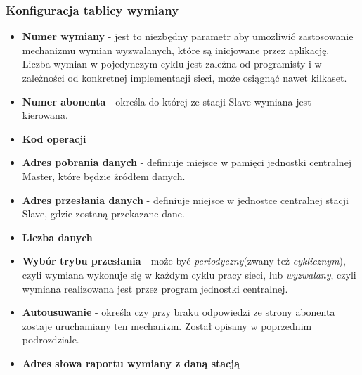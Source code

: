 \documentclass[a4paper,twoside]{article}
\begin{document}
	\subsubsection{Konfiguracja tablicy wymiany}
	\begin{itemize}
		\item \textbf{Numer wymiany} - jest to niezbędny parametr aby umożliwić zastosowanie mechanizmu wymian wyzwalanych, które są inicjowane przez aplikację. Liczba wymian w pojedynczym cyklu jest zależna od programisty i w zależności od konkretnej implementacji sieci, może osiągnąć nawet kilkaset.
		\item \textbf{Numer abonenta} - określa do której ze stacji Slave wymiana jest kierowana.
		\item \textbf{Kod operacji}
		\item \textbf{Adres pobrania danych} - definiuje miejsce w pamięci jednostki centralnej Master, które będzie źródłem danych.
		\item \textbf{Adres przesłania danych} - definiuje miejsce w jednostce centralnej stacji Slave, gdzie zostaną przekazane dane.
		\item \textbf{Liczba danych}
		\item \textbf{Wybór trybu przesłania} - może być \textit{periodyczny}(zwany też \textit{cyklicznym}), czyli wymiana wykonuje się w każdym cyklu pracy sieci, lub \textit{wyzwalany}, czyli wymiana realizowana jest przez program jednostki centralnej.
		\item \textbf{Autousuwanie} - określa czy przy braku odpowiedzi ze strony abonenta zostaje uruchamiany ten mechanizm. Został opisany w poprzednim podrozdziale.
		\item \textbf{Adres słowa raportu wymiany z daną stacją}
	\end{itemize}
\end{document}
